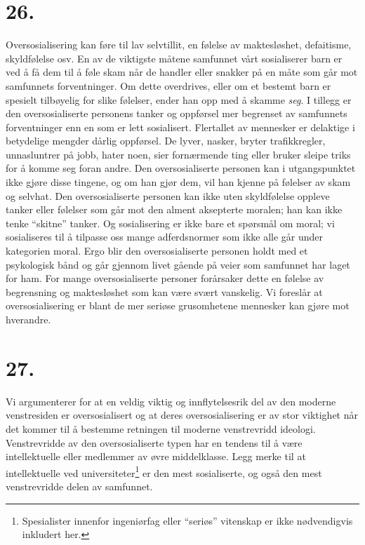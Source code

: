 \documentclass[oneside]{book}
\begin{document}
\section*{26.}
Oversosialisering kan føre til lav selvtillit, en følelse av maktesløshet,
defaitisme, skyldfølelse osv. En av de viktigste måtene samfunnet vårt
sosialiserer barn er ved å få dem til å føle skam når de handler eller snakker
på en måte som går mot samfunnets forventninger. Om dette overdrives, eller om
et bestemt barn er spesielt tilbøyelig for slike følelser, ender han opp med å
skamme \emph{seg}. I tillegg er den oversosialiserte personens tanker og
oppførsel mer begrenset av samfunnets forventninger enn en som er lett
sosialisert. Flertallet av mennesker er delaktige i betydelige mengder dårlig
oppførsel. De lyver, nasker, bryter trafikkregler, unnasluntrer på jobb, hater
noen, sier fornærmende ting eller bruker sleipe triks for å komme seg foran
andre. Den oversosialiserte personen kan i utgangspunktet ikke gjøre disse
tingene, og om han gjør dem, vil han kjenne på følelser av skam og selvhat. Den
oversosialiserte personen kan ikke uten skyldfølelse oppleve tanker eller
følelser som går mot den alment aksepterte moralen; han kan ikke tenke
``skitne'' tanker. Og sosialisering er ikke bare et spørsmål om moral; vi
sosialiseres til å tilpasse oss mange adferdsnormer som ikke alle går under
kategorien moral. Ergo blir den oversosialiserte personen holdt med et
psykologisk bånd og går gjennom livet gående på veier som samfunnet har laget
for ham. For mange oversosialiserte personer forårsaker dette en følelse av
begrensning og maktesløshet som kan være svært vanskelig. Vi foreslår at
oversosialisering er blant de mer seriøse grusomhetene mennesker kan gjøre mot
hverandre.

\section*{27.}
Vi argumenterer for at en veldig viktig og innflytelsesrik del av den moderne
venstresiden er oversosialisert og at deres oversosialisering er av stor
viktighet når det kommer til å bestemme retningen til moderne venstrevridd
ideologi. Venstrevridde av den oversosialiserte typen har en tendens til å være
intellektuelle eller medlemmer av øvre middelklasse. Legg merke til at
intellektuelle ved universiteter\footnote{Spesialister innenfor ingeniørfag
eller ``seriøs'' vitenskap er ikke nødvendigvis inkludert her.} er den mest
sosialiserte, og også den mest venstrevridde delen av samfunnet.
\end{document}
